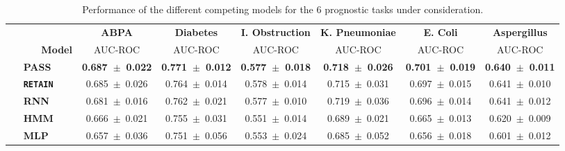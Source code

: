 \documentclass[twoside,11pt]{article}
\begin{document}
\begin{table*}[t]
\centering
\begin{tabular}{l||cccccc}           
 & {\tiny \bf ABPA} & {\tiny \bf Diabetes} & {\tiny {\bf I. Obstruction}} & {\tiny \bf K. Pneumoniae} & {\tiny \bf E. Coli} & {\tiny {\bf Aspergillus}}  \\
{\tiny \,\,\,\,\,\,\,\,\,\,\,\,\,\,\,\,\,\,\,\textbf{Model}} & {\tiny AUC-ROC} & {\tiny AUC-ROC} & {\tiny AUC-ROC} & {\tiny AUC-ROC} & {\tiny AUC-ROC} & {\tiny AUC-ROC}\\
\hline \hline
{\tiny \,\,\,\,\,\,\,\,\textbf{PASS}} & {\bf \mbox{\tiny 0.687 $\pm$ 0.022}} & {\bf \mbox{\tiny 0.771 $\pm$ 0.012}} & {\bf \mbox{\tiny 0.577 $\pm$ 0.018}} & {\bf \mbox{\tiny 0.718 $\pm$ 0.026}} & {\bf \mbox{\tiny 0.701 $\pm$ 0.019}} & {\bf \mbox{\tiny 0.640 $\pm$ 0.011}} \\ 
{\tiny \,\,\,\,\,\,\,\,\textbf{\texttt{RETAIN}}} & \mbox{\tiny 0.685 $\pm$ 0.026} & \mbox{\tiny 0.764 $\pm$ 0.014} & \mbox{\tiny 0.578 $\pm$ 0.014} & \mbox{\tiny 0.715 $\pm$ 0.031} & \mbox{\tiny 0.697 $\pm$ 0.015} & \mbox{\tiny 0.641 $\pm$ 0.010} \\ 
{\tiny \,\,\,\,\,\,\,\,\textbf{RNN}} & \mbox{\tiny 0.681 $\pm$ 0.016} & \mbox{\tiny 0.762 $\pm$ 0.021} & \mbox{\tiny 0.577 $\pm$ 0.010}  & \mbox{\tiny 0.719 $\pm$ 0.036} & \mbox{\tiny 0.696 $\pm$ 0.014} & \mbox{\tiny 0.641 $\pm$ 0.012}   \\  
{\tiny \,\,\,\,\,\,\,\,\textbf{HMM}} & \mbox{\tiny 0.666 $\pm$ 0.021} & \mbox{\tiny 0.755 $\pm$ 0.031} & \mbox{\tiny 0.551 $\pm$ 0.014} & \mbox{\tiny 0.689 $\pm$ 0.021} & \mbox{\tiny 0.665 $\pm$ 0.013} & \mbox{\tiny 0.620 $\pm$ 0.009}   \\   
{\tiny \,\,\,\,\,\,\,\,\textbf{MLP}} & \mbox{\tiny 0.657 $\pm$ 0.036} & \mbox{\tiny 0.751 $\pm$ 0.056} & \mbox{\tiny 0.553 $\pm$ 0.024} & \mbox{\tiny 0.685 $\pm$ 0.052} & \mbox{\tiny 0.656 $\pm$ 0.018} & \mbox{\tiny 0.601 $\pm$ 0.012} \\   
\end{tabular}
\caption{\footnotesize Performance of the different competing models for the 6 prognostic tasks under consideration.}
\label{Table2}
\end{table*}
\end{document}
